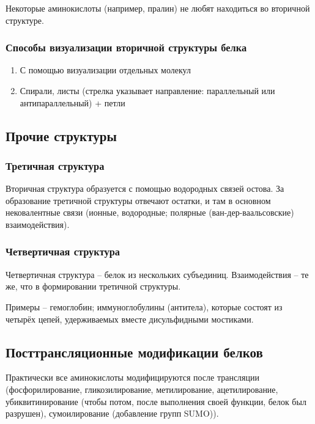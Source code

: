 \documentclass[main.tex]{subfiles}
\begin{document}
Некоторые аминокислоты (например, пралин) не любят находиться во вторичной структуре.

\subsubsection{Способы визуализации вторичной структуры белка}

\begin{enumerate}[noitemsep]
	\item С помощью визуализации отдельных молекул
	\item Спирали, листы (стрелка указывает направление: параллельный или антипараллельный) + петли
\end{enumerate}

\subsection{Прочие структуры}

\subsubsection{Третичная структура}

Вторичная структура образуется с помощью водородных связей остова.
За образование третичной структуры отвечают остатки, и там в основном нековалентные связи (ионные, водородные; полярные (ван-дер-ваальсовские) взаимодействия).

\subsubsection{Четвертичная структура}

Четвертичная структура -- белок из нескольких субъединиц.
Взаимодействия -- те же, что в формировании третичной структуры.


Примеры -- гемоглобин; иммуноглобулины (антитела), которые состоят из четырёх цепей, удерживаемых вместе дисульфидными мостиками.

\subsection{Посттрансляционные модификации белков}

Практически все аминокислоты модифицируются после трансляции (фосфорилирование, гликозилирование, метилирование, ацетилирование, убиквитинирование (чтобы потом, после выполнения своей функции, белок был разрушен), сумоилирование (добавление групп  SUMO)).
\end{document}
